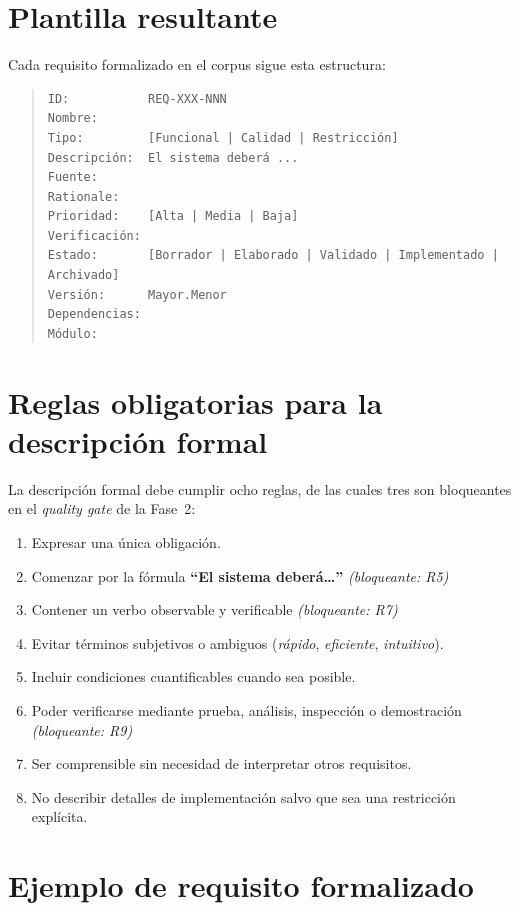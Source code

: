 \section{Plantilla resultante}

Cada requisito formalizado en el corpus sigue esta estructura:

\begin{quote}
\begin{verbatim}
ID:           REQ-XXX-NNN
Nombre:       
Tipo:         [Funcional | Calidad | Restricción]
Descripción:  El sistema deberá ...
Fuente:       
Rationale:    
Prioridad:    [Alta | Media | Baja]
Verificación: 
Estado:       [Borrador | Elaborado | Validado | Implementado | Archivado]
Versión:      Mayor.Menor
Dependencias: 
Módulo:       
\end{verbatim}
\end{quote}

\section{Reglas obligatorias para la descripci\'on formal}

La descripci\'on formal debe cumplir ocho reglas, de las cuales tres son bloqueantes en el \emph{quality gate} de la Fase~2:

\begin{enumerate}
    \item Expresar una \'unica obligaci\'on.
    \item Comenzar por la f\'ormula \textbf{``El sistema deber\'a\dots''} \hfill\textit{(bloqueante: R5)}
    \item Contener un verbo observable y verificable \hfill\textit{(bloqueante: R7)}
    \item Evitar t\'erminos subjetivos o ambiguos (\emph{r\'apido}, \emph{eficiente}, \emph{intuitivo}).
    \item Incluir condiciones cuantificables cuando sea posible.
    \item Poder verificarse mediante prueba, an\'alisis, inspecci\'on o demostraci\'on \hfill\textit{(bloqueante: R9)}
    \item Ser comprensible sin necesidad de interpretar otros requisitos.
    \item No describir detalles de implementaci\'on salvo que sea una restricci\'on expl\'icita.
\end{enumerate}

\section{Ejemplo de requisito formalizado}

